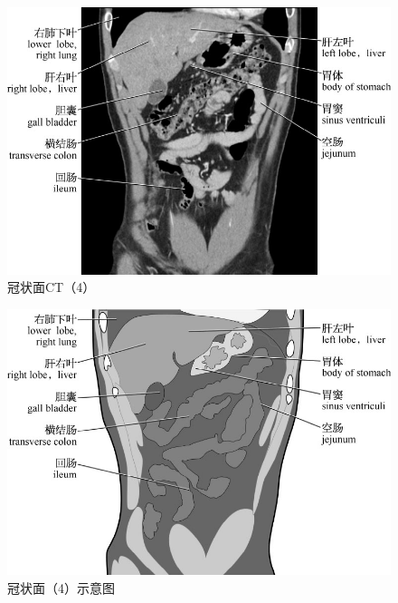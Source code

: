 \begin{figure}[!htbp]
 \centering
 \includegraphics{./images/Image00102.jpg}
 \captionsetup{justification=centering}
 \caption{冠状面CT（4）}
  \end{figure} 
 \FloatBarrier

\begin{figure}[!htbp]
 \centering
 \includegraphics{./images/Image00103.jpg}
 \captionsetup{justification=centering}
 \caption{冠状面（4）示意图}
  \end{figure} 
 \FloatBarrier

